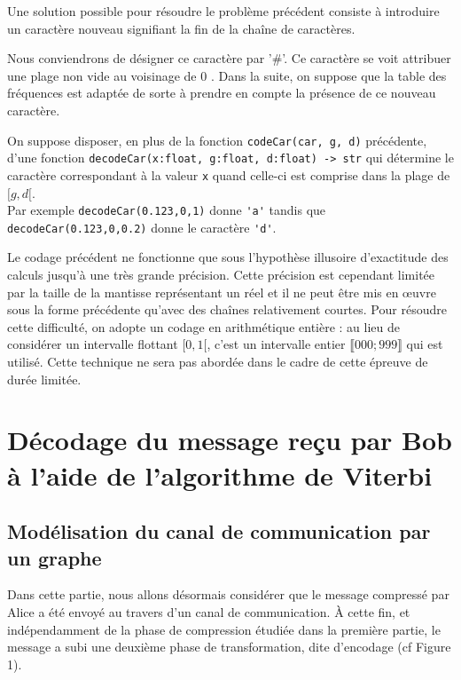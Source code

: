 
Une solution possible pour résoudre le problème précédent consiste à introduire un caractère nouveau signifiant la fin de la chaîne de caractères.

Nous conviendrons de désigner ce caractère par '\#'. Ce caractère se voit attribuer une plage non vide au voisinage de 0 . Dans la suite, on suppose que la table des fréquences est adaptée de sorte à prendre en compte la présence de ce nouveau caractère.

On suppose disposer, en plus de la fonction \lstinline{codeCar(car, g, d)} précédente, d'une fonction \lstinline{decodeCar(x:float, g:float, d:float) -> str} qui détermine le caractère correspondant à la valeur \lstinline{x} quand celle-ci est comprise dans la plage de $[g, d[$.\\
Par exemple \lstinline{decodeCar(0.123,0,1)} donne \lstinline{'a'} tandis que \lstinline{decodeCar(0.123,0,0.2)} donne le caractère \lstinline{'d'}.


Le codage précédent ne fonctionne que sous l'hypothèse illusoire d'exactitude des calculs jusqu'à une très grande précision. Cette précision est cependant limitée par la taille de la mantisse représentant un réel et il ne peut être mis en œuvre sous la forme précédente qu'avec des chaînes relativement courtes. Pour résoudre cette difficulté, on adopte un codage en arithmétique entière : au lieu de considérer un intervalle flottant $[0,1[$, c'est un intervalle entier $\llbracket 000 ; 999 \rrbracket$ qui est utilisé. Cette technique ne sera pas abordée dans le cadre de cette épreuve de durée limitée.

\section{Décodage du message reçu par Bob à l'aide de l'algorithme de Viterbi}
\subsection{Modélisation du canal de communication par un graphe}
Dans cette partie, nous allons désormais considérer que le message compressé par Alice a été envoyé au travers d'un canal de communication. À cette fin, et indépendamment de la phase de compression étudiée dans la première partie, le message a subi une deuxième phase de transformation, dite d'encodage (cf Figure 1).

